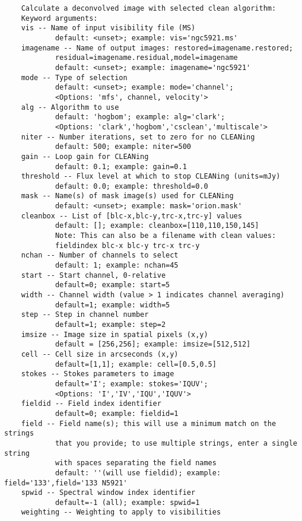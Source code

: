 \vspace{3mm}
\small
\begin{verbatim}    
    Calculate a deconvolved image with selected clean algorithm:
    Keyword arguments:
    vis -- Name of input visibility file (MS)
            default: <unset>; example: vis='ngc5921.ms'
    imagename -- Name of output images: restored=imagename.restored;
            residual=imagename.residual,model=imagename
            default: <unset>; example: imagename='ngc5921'
    mode -- Type of selection 
            default: <unset>; example: mode='channel'; 
            <Options: 'mfs', channel, velocity'>
    alg -- Algorithm to use
            default: 'hogbom'; example: alg='clark'; 
            <Options: 'clark','hogbom','csclean','multiscale'>
    niter -- Number iterations, set to zero for no CLEANing
            default: 500; example: niter=500
    gain -- Loop gain for CLEANing
            default: 0.1; example: gain=0.1
    threshold -- Flux level at which to stop CLEANing (units=mJy)
            default: 0.0; example: threshold=0.0
    mask -- Name(s) of mask image(s) used for CLEANing
            default: <unset>; example: mask='orion.mask'
    cleanbox -- List of [blc-x,blc-y,trc-x,trc-y] values
            default: []; example: cleanbox=[110,110,150,145]
            Note: This can also be a filename with clean values:
            fieldindex blc-x blc-y trc-x trc-y
    nchan -- Number of channels to select
            default: 1; example: nchan=45
    start -- Start channel, 0-relative
            default=0; example: start=5
    width -- Channel width (value > 1 indicates channel averaging)
            default=1; example: width=5
    step -- Step in channel number
            default=1; example: step=2      
    imsize -- Image size in spatial pixels (x,y)
            default = [256,256]; example: imsize=[512,512]
    cell -- Cell size in arcseconds (x,y)
            default=[1,1]; example: cell=[0.5,0.5]
    stokes -- Stokes parameters to image
            default='I'; example: stokes='IQUV'; 
            <Options: 'I','IV','IQU','IQUV'>
    fieldid -- Field index identifier
            default=0; example: fieldid=1
    field -- Field name(s); this will use a minimum match on the strings
            that you provide; to use multiple strings, enter a single string
            with spaces separating the field names
            default: ''(will use fieldid); example: field='133',field='133 N5921'
    spwid -- Spectral window index identifier
            default=-1 (all); example: spwid=1
    weighting -- Weighting to apply to visibilities

\end{verbatim}
